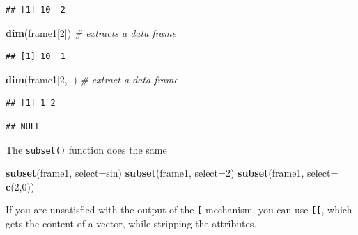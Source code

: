 \documentclass[]{book}
\newenvironment{Shaded}{\begin{snugshade}}{\end{snugshade}}
\newcommand{\KeywordTok}[1]{\textcolor[rgb]{0.13,0.29,0.53}{\textbf{{#1}}}}
\newcommand{\DataTypeTok}[1]{\textcolor[rgb]{0.13,0.29,0.53}{{#1}}}
\newcommand{\DecValTok}[1]{\textcolor[rgb]{0.00,0.00,0.81}{{#1}}}
\newcommand{\CommentTok}[1]{\textcolor[rgb]{0.56,0.35,0.01}{\textit{{#1}}}}
\newcommand{\NormalTok}[1]{{#1}}
\theoremstyle{definition}
\theoremstyle{definition}
\theoremstyle{remark}
\begin{document}
\begin{verbatim}
## [1] 10  2
\end{verbatim}

\begin{Shaded}
\begin{Highlighting}[]
\KeywordTok{dim}\NormalTok{(frame1[}\DecValTok{2}\NormalTok{])  }\CommentTok{# extracts a data frame}
\end{Highlighting}
\end{Shaded}

\begin{verbatim}
## [1] 10  1
\end{verbatim}

\begin{Shaded}
\begin{Highlighting}[]
\KeywordTok{dim}\NormalTok{(frame1[}\DecValTok{2}\NormalTok{, ])  }\CommentTok{# extract a data frame}
\end{Highlighting}
\end{Shaded}

\begin{verbatim}
## [1] 1 2
\end{verbatim}

\begin{Shaded}
\end{Shaded}

\begin{verbatim}
## NULL
\end{verbatim}

The \texttt{subset()} function does the same

\begin{Shaded}
\begin{Highlighting}[]
\KeywordTok{subset}\NormalTok{(frame1, }\DataTypeTok{select=}\NormalTok{sin) }
\KeywordTok{subset}\NormalTok{(frame1, }\DataTypeTok{select=}\DecValTok{2}\NormalTok{)}
\KeywordTok{subset}\NormalTok{(frame1, }\DataTypeTok{select=} \KeywordTok{c}\NormalTok{(}\DecValTok{2}\NormalTok{,}\DecValTok{0}\NormalTok{))}
\end{Highlighting}
\end{Shaded}

If you are unsatisfied with the output of the \texttt{{[}} mechanism,
you can use \texttt{{[}{[}}, which gets the content of a vector, while
stripping the attributes.
\end{document}
